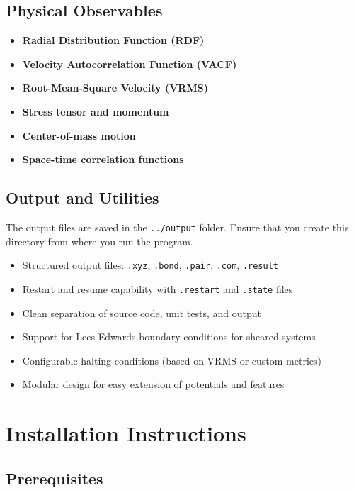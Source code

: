 \documentclass[a4paper,10pt]{article}
\begin{document}
\subsection*{Physical Observables}
\begin{itemize}
    \item \textbf{Radial Distribution Function (RDF)}
    \item \textbf{Velocity Autocorrelation Function (VACF)}
    \item \textbf{Root-Mean-Square Velocity (VRMS)}
    \item \textbf{Stress tensor and momentum}
    \item \textbf{Center-of-mass motion}
    \item \textbf{Space-time correlation functions}
\end{itemize}

\subsection*{Output and Utilities}
The output files are saved in the \texttt{../output} folder. Ensure that you create this directory from where you run 
the program.

\begin{itemize}
    \item Structured output files: \texttt{.xyz}, \texttt{.bond}, \texttt{.pair}, \texttt{.com}, \texttt{.result}
    \item Restart and resume capability with \texttt{.restart} and \texttt{.state} files
    \item Clean separation of source code, unit tests, and output
    \item Support for Lees-Edwards boundary conditions for sheared systems
    \item Configurable halting conditions (based on VRMS or custom metrics)
    \item Modular design for easy extension of potentials and features
\end{itemize}

\section*{Installation Instructions}

\subsection*{Prerequisites}
\end{document}
